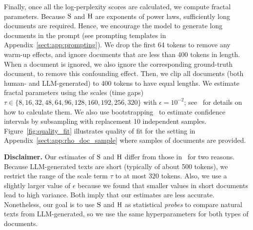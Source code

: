 Finally, once all the log-perplexity scores are calculated, we compute fractal parameters. Because  $\mathrm{S}$ and $\mathrm{H}$ are exponents of power laws, sufficiently long documents are required. Hence, we  encourage the model to generate long documents in the prompt (see prompting templates in Appendix~\ref{sect:app:prompting}). We drop the first 64 tokens to remove any warm-up effects, and ignore documents that are less than 400 tokens in length. When a document is ignored, we also ignore the corresponding ground-truth document, to remove this confounding effect. Then, we clip all documents (both human- and LLM-generated) to 400 tokens to have equal lengths. We estimate fractal parameters using the scales (time gaps) $\tau\in\{8, 16, 32, 48, 64, 96, 128, 160, 192, 256, 320\}$ with $\epsilon=10^{-2}$; see~\cite{alabdulmohsin2024fractals} for details on how to calculate them. We also use bootstrapping~\citep{efron1994introduction} to estimate confidence intervals by subsampling with replacement 10 independent samples. Figure~\ref{fig:quality_fit} illustrates quality of fit for the setting in Appendix~\ref{sect:app:rho_doc_sample} where samples of documents are provided.

\textbf{Disclaimer.} Our estimates of $\mathrm{S}$ and $\mathrm{H}$ differ from those in~\cite{alabdulmohsin2024fractals} for two reasons. Because LLM-generated texts are short (typically of about 500 tokens), we restrict the range of the scale term $\tau$ to at most $320$ tokens. Also, we use a slightly larger value of $\epsilon$ because we found that smaller values in short documents lead to high variance. Both imply that our estimates are less accurate. Nonetheless, our goal is to use $\mathrm{S}$ and $\mathrm{H}$ as statistical \emph{probes} to compare natural texts from LLM-generated, so we use the same hyperparameters for both types of documents.
